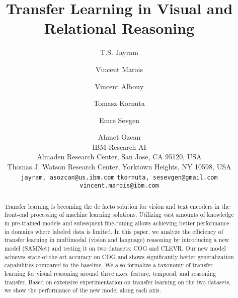 \documentclass[10pt,twocolumn,letterpaper]{article}
\theoremstyle{remark}
\begin{document}
\title{Transfer Learning in Visual and Relational Reasoning}

\author{T.S. Jayram \and  Vincent Marois \and Vincent Albouy \and Tomasz Kornuta  \and Emre Sevgen \and Ahmet Ozcan\\
IBM Research AI\\
Almaden Research Center, San Jose, CA 95120, USA\\
Thomas J. Watson Research Center, Yorktown Heights, NY 10598, USA\\
{\tt\small {jayram,  asozcan}@us.ibm.com}
{\tt\small {tkornuta, sesevgen}@gmail.com}
{\tt\small vincent.marois@ibm.com}
}

\maketitle

\begin{abstract}
  Transfer learning is becoming the de facto solution for vision and text encoders in the front-end processing of machine learning solutions. Utilizing vast amounts of knowledge in pre-trained models and subsequent fine-tuning allows achieving better performance in domains where labeled data is limited. In this paper, we analyze the efficiency of transfer learning in multimodal (vision and language) reasoning by introducing a new model (SAMNet) and testing it on two datasets: COG and CLEVR.  Our new model achieves state-of-the-art accuracy on COG and shows significantly better generalization capabilities compared to the baseline. We also formalize a taxonomy of transfer learning for visual reasoning around three axes: feature, temporal, and reasoning transfer. Based on extensive experimentation on transfer learning on the two datasets, we show the performance of the new model along each axis.
\end{abstract}













\clearpage
{\small


}

%
\end{document}
